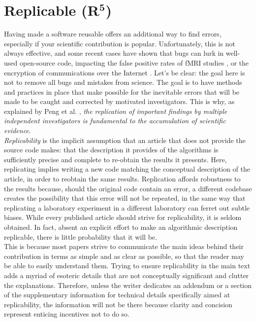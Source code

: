 \documentclass[a4paper,11pt]{article}
\begin{document}
\section*{Replicable (R$^{\mathbf 5}$)}

Having made a software reusable offers an additional way to find errors, especially if your scientific contribution is popular. Unfortunately, this is not always effective, and some recent cases have shown that bugs can lurk in well-used open-source code, impacting the false positive rates of fMRI studies \citep{Eklund:2016}, or the encryption of communications over the Internet \citep{Durumeric:2014}. Let's be clear: the goal here is not to remove all bugs and mistakes from science. The goal is to have methods and practices in place that make possible for the inevitable errors that will be made to be caught and corrected by motivated investigators. This is why, as explained by Peng et al. \citep{Peng:2006}, {\em the replication of
  important findings by multiple independent investigators is fundamental to
  the accumulation of scientific evidence}.\\

\emph{Replicability} is the implicit
assumption that an article that does not provide the source code makes: that
the description it provides of the algorithms is sufficiently precise and
complete to re-obtain the results it presents. Here, replicating implies writing a new code matching the conceptual description of the article, in order to reobtain the same results. Replication affords robustness to the results because, should the original code contain an error, a different codebase creates the possibility that this error will not be repeated, in the same way that replicating a laboratory experiment in a different laboratory can ferret out subtle biases. While every published article should strive for replicability, it is seldom obtained. In fact, absent an explicit effort to make an algorithmic description replicable, there is little probability that it will be.\\

This is because most papers strive to communicate the main ideas behind their contribution in terms as simple and as clear as possible, so that the reader may be able to easily understand them. Trying to ensure replicability in the main text adds a myriad of esoteric details that are not conceptually significant and clutter the explanations. Therefore, unless the writer dedicates an addendum or a section of the supplementary information for technical details specifically aimed at replicability, the information will not be there because clarity and concision represent enticing incentives not to do so.\\
\end{document}
